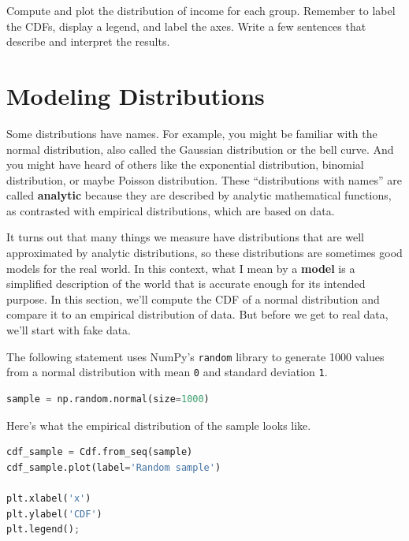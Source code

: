 Compute and plot the distribution of income for each group. Remember to
label the CDFs, display a legend, and label the axes. Write a few
sentences that describe and interpret the results.

\hypertarget{modeling-distributions}{%
\section{Modeling Distributions}\label{modeling-distributions}}

Some distributions have names. For example, you might be familiar with
the normal distribution, also called the Gaussian distribution or the
bell curve. And you might have heard of others like the exponential
distribution, binomial distribution, or maybe Poisson distribution.
These ``distributions with names'' are called \textbf{analytic} because
they are described by analytic mathematical functions, as contrasted
with empirical distributions, which are based on data.

It turns out that many things we measure have distributions that are
well approximated by analytic distributions, so these distributions are
sometimes good models for the real world. In this context, what I mean
by a \textbf{model} is a simplified description of the world that is
accurate enough for its intended purpose. In this section, we'll compute
the CDF of a normal distribution and compare it to an empirical
distribution of data. But before we get to real data, we'll start with
fake data.

The following statement uses NumPy's \passthrough{\lstinline!random!}
library to generate 1000 values from a normal distribution with mean
\passthrough{\lstinline!0!} and standard deviation
\passthrough{\lstinline!1!}.

\begin{lstlisting}[language=Python,style=source]
sample = np.random.normal(size=1000)
\end{lstlisting}

Here's what the empirical distribution of the sample looks like.

\begin{lstlisting}[language=Python,style=source]
cdf_sample = Cdf.from_seq(sample)
cdf_sample.plot(label='Random sample')

plt.xlabel('x')
plt.ylabel('CDF')
plt.legend();
\end{lstlisting}

